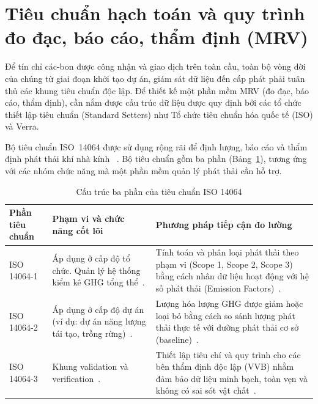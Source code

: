 \section{Tiêu chuẩn hạch toán và quy trình đo đạc, báo cáo, thẩm định (MRV)}
\label{sec:mrv}

Để tín chỉ các-bon được công nhận và giao dịch trên toàn cầu, toàn bộ vòng đời của chúng từ giai đoạn khởi tạo dự án, giám sát dữ liệu đến cấp phát phải tuân thủ các khung tiêu chuẩn độc lập. Để thiết kế một phần mềm MRV (đo đạc, báo cáo, thẩm định), cần nắm được cấu trúc dữ liệu được quy định bởi các tổ chức thiết lập tiêu chuẩn (Standard Setters) như Tổ chức tiêu chuẩn hóa quốc tế (ISO) và Verra.

Bộ tiêu chuẩn ISO~14064 được sử dụng rộng rãi để định lượng, báo cáo và thẩm định phát thải khí nhà kính~\cite{iso14064-1} \cite{iso14064-2} \cite{iso14064-3}. Bộ tiêu chuẩn gồm ba phần (Bảng~\ref{tab:iso14064}), tương ứng với các nhóm chức năng mà một phần mềm quản lý phát thải cần hỗ trợ.

\begin{table}[htbp]
    \centering
    \caption{Cấu trúc ba phần của tiêu chuẩn ISO 14064}
    \label{tab:iso14064}
    \small
    \renewcommand{\arraystretch}{1.25}
    \begin{tabularx}{\textwidth}{|p{2.3cm}|X|X|}
        \hline
        \textbf{Phần tiêu chuẩn} & \textbf{Phạm vi và chức năng cốt lõi} & \textbf{Phương pháp tiếp cận đo lường} \\
        \hline
        ISO 14064-1\index{ISO 14064!Phan 1@Phần 1 (cấp tổ chức)} & Áp dụng ở cấp độ tổ chức. Quản lý hệ thống kiểm kê GHG tổng thể~\cite{iso14064-1}. & Tính toán và phân loại phát thải theo phạm vi (Scope 1, Scope 2, Scope 3)\index{Scope 1, 2, 3} bằng cách nhân dữ liệu hoạt động với hệ số phát thải (Emission Factors)\index{He so phat thai@Hệ số phát thải (Emission Factor)}~\cite{iso14064-1}. \\
        \hline
        ISO 14064-2\index{ISO 14064!Phan 2@Phần 2 (cấp dự án)} & Áp dụng ở cấp độ dự án (ví dụ: dự án năng lượng tái tạo, trồng rừng)~\cite{iso14064-2}. & Lượng hóa lượng GHG được giảm hoặc loại bỏ bằng cách so sánh lượng phát thải thực tế với đường phát thải cơ sở (baseline)~\cite{iso14064-2}. \\
        \hline
        ISO 14064-3\index{ISO 14064!Phan 3@Phần 3 (validation, verification)} & Khung validation và verification~\cite{iso14064-3}. & Thiết lập tiêu chí và quy trình cho các bên thẩm định độc lập (VVB)\index{VVB} nhằm đảm bảo dữ liệu minh bạch, toàn vẹn và không có sai sót vật chất~\cite{iso14064-3}. \\
        \hline
    \end{tabularx}
\end{table}

